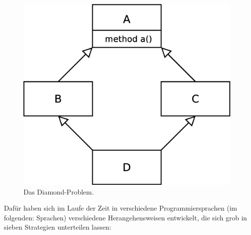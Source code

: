 \begin{figure}[h]
\centering
 \includegraphics[scale = 0.3]{pictures/diamond}
 \caption{Das Diamond-Problem.}
 \label{diamond}
\end{figure}

Dafür haben sich im Laufe der Zeit in verschiedene Programmiersprachen (im folgenden: Sprachen) verschiedene Herangehensweisen entwickelt, die sich grob in sieben Strategien unterteilen lassen:

